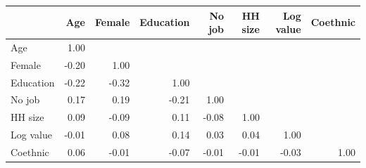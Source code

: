 \begin{tabular}{lrrrrrrr}
\toprule
 & Age & Female & Education & No job & HH size & Log value & Coethnic \\
\midrule
Age & 1.00 &  &  &  &  &  &  \\
Female & -0.20 & 1.00 &  &  &  &  &  \\
Education & -0.22 & -0.32 & 1.00 &  &  &  &  \\
No job & 0.17 & 0.19 & -0.21 & 1.00 &  &  &  \\
HH size & 0.09 & -0.09 & 0.11 & -0.08 & 1.00 &  &  \\
Log value & -0.01 & 0.08 & 0.14 & 0.03 & 0.04 & 1.00 &  \\
Coethnic & 0.06 & -0.01 & -0.07 & -0.01 & -0.01 & -0.03 & 1.00 \\
\bottomrule
\end{tabular}

